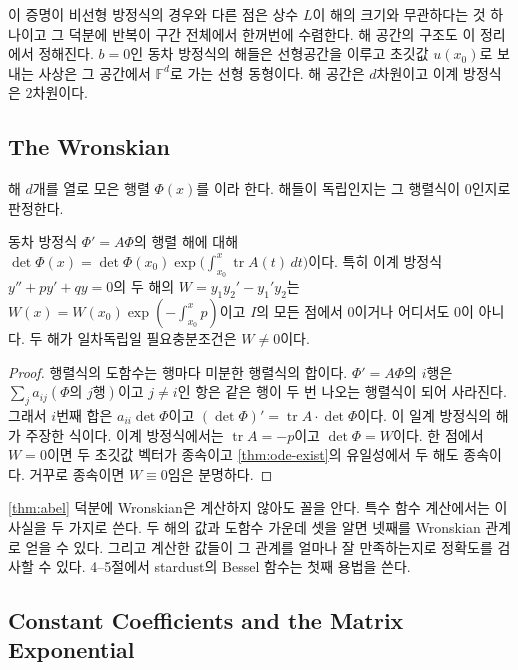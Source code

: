 이 증명이 비선형 방정식의 경우와 다른 점은 상수 $L$이 해의 크기와 무관하다는 것 하나이고 그 덕분에 반복이 구간 전체에서 한꺼번에 수렴한다. 해 공간의 구조도 이 정리에서 정해진다. $b=0$인 동차 방정식의 해들은 선형공간을 이루고 초깃값 $u(x_0)$로 보내는 사상은 그 공간에서 $\mathbb{F}^d$로 가는 선형 동형이다. 해 공간은 $d$차원이고 이계 방정식은 $2$차원이다.

\subsection{The Wronskian}

해 $d$개를 열로 모은 행렬 $\Phi(x)$를 이라 한다. 해들이 독립인지는 그 행렬식이 $0$인지로 판정한다.

\begin{theorem}
\label{thm:abel}
동차 방정식 $\Phi'=A\Phi$의 행렬 해에 대해 $\det\Phi(x)=\det\Phi(x_0)\exp\bigl(\int_{x_0}^x\operatorname{tr}A(t)\,dt\bigr)$이다. 특히 이계 방정식 $y''+py'+qy=0$의 두 해의  $W=y_1y_2'-y_1'y_2$는 $W(x)=W(x_0)\exp(-\int_{x_0}^xp)$이고 $I$의 모든 점에서 $0$이거나 어디서도 $0$이 아니다. 두 해가 일차독립일 필요충분조건은 $W\ne0$이다.
\end{theorem}

\begin{proof}
행렬식의 도함수는 행마다 미분한 행렬식의 합이다. $\Phi'=A\Phi$의 $i$행은 $\sum_ja_{ij}(\Phi\text{의 }j\text{행})$이고 $j\ne i$인 항은 같은 행이 두 번 나오는 행렬식이 되어 사라진다. 그래서 $i$번째 합은 $a_{ii}\det\Phi$이고 $(\det\Phi)'=\operatorname{tr}A\cdot\det\Phi$이다. 이 일계 방정식의 해가 주장한 식이다. 이계 방정식에서는 $\operatorname{tr}A=-p$이고 $\det\Phi=W$이다. 한 점에서 $W=0$이면 두 초깃값 벡터가 종속이고 \cref{thm:ode-exist}의 유일성에서 두 해도 종속이다. 거꾸로 종속이면 $W\equiv0$임은 분명하다.
\end{proof}

\cref{thm:abel} 덕분에 Wronskian은 계산하지 않아도 꼴을 안다. 특수 함수 계산에서는 이 사실을 두 가지로 쓴다. 두 해의 값과 도함수 가운데 셋을 알면 넷째를 Wronskian 관계로 얻을 수 있다. 그리고 계산한 값들이 그 관계를 얼마나 잘 만족하는지로 정확도를 검사할 수 있다. 4--5절에서 stardust의 Bessel 함수는 첫째 용법을 쓴다.

\subsection{Constant Coefficients and the Matrix Exponential}

